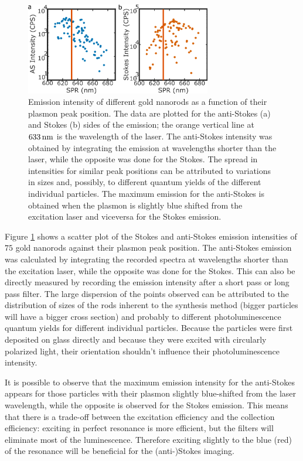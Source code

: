 \begin{figure}[tp] \centering
\includegraphics[width=8.1cm]{Chapters/03_Background_Free/Figures/03_Intensity_SPR/Intensity_SPR.png}
\caption{Emission intensity of different gold nanorods as a function of their
plasmon peak position. The data are plotted for the anti-Stokes (a) and Stokes
(b) sides of the emission; the orange vertical line at $633\,\textrm{nm}$ is the
wavelength of the laser. The anti-Stokes intensity was obtained by
integrating the emission at wavelengths shorter than the laser, while the
opposite was done for the Stokes. The spread in intensities for similar peak
positions can be attributed to variations in sizes and, possibly, to different
quantum yields of the different individual particles. The maximum emission for
the anti-Stokes is obtained when the plasmon is slightly blue shifted from the
excitation laser and viceversa for the Stokes emission.}
	\label{fig:emission_peak_position}
\end{figure} 

Figure \ref{fig:emission_peak_position} shows a scatter plot of the Stokes and
anti-Stokes emission intensities of $75$ gold nanorods against their plasmon
peak position. The anti-Stokes emission was calculated by integrating
the recorded spectra at wavelengths shorter than the excitation laser, while the
opposite was done for the Stokes. This can also be directly measured by
recording the emission intensity after a short pass or long pass filter. The
large dispersion of the points observed can be attributed to the distribution of
sizes of the rods inherent to the synthesis method\cite{Zijlstra2011} (bigger
particles will have a bigger cross section) and probably to different
photoluminescence quantum yields for different individual particles. Because the
particles were first deposited on glass directly and because they were excited
with circularly polarized light, their orientation shouldn't influence their
photoluminescence intensity.

It is possible to observe that the maximum emission intensity for the
anti-Stokes appears for those particles with their plasmon slightly blue-shifted
from the laser wavelength, while the opposite is observed for the Stokes
emission. This means that there is a trade-off between the excitation efficiency
and the collection efficiency: exciting in perfect resonance is more efficient,
but the filters will eliminate most of the luminescence. Therefore exciting
slightly to the blue (red) of the resonance will be beneficial for the
(anti-)Stokes imaging. 


